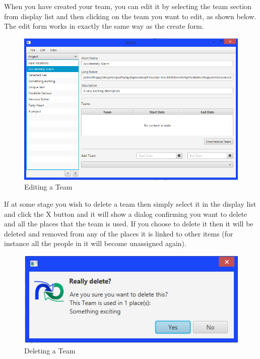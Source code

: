 When you have created your team, you can edit it by selecting the team section from display list and then clicking on the team you want to edit, as shown below. The edit form works in exactly the same way as the create form.

\begin{figure}[H]
\centering
\includegraphics[width=\textwidth]{images/screenshots/teams4.PNG}
\caption{Editing a Team}
\label{fig:new_project}
\end{figure}

If at some stage you wish to delete a team then simply select it in the display list and click the X button and it will show a dialog confirming you want to delete and all the places that the team is used. If you choose to delete it then it will be deleted and removed from any of the places it is linked to other items (for instance all the people in it will become unassigned again).

\begin{figure}[H]
\centering
\includegraphics[width=\textwidth]{images/screenshots/teams5.PNG}
\caption{Deleting a Team}
\label{fig:new_project}
\end{figure}